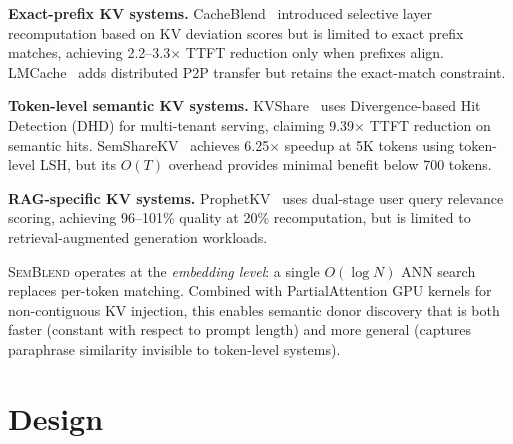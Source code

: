 \documentclass[11pt,twocolumn]{article}
\newcommand{\semblend}{\textsc{SemBlend}\xspace}
\begin{document}
\textbf{Exact-prefix KV systems.}
CacheBlend~\cite{cacheblend} introduced selective layer recomputation
based on KV deviation scores but is limited to exact prefix matches,
achieving 2.2--3.3$\times$ TTFT reduction only when prefixes align.
LMCache~\cite{lmcache} adds distributed P2P transfer but retains the
exact-match constraint.

\textbf{Token-level semantic KV systems.}
KVShare~\cite{kvshare} uses Divergence-based Hit Detection (DHD)
for multi-tenant serving, claiming 9.39$\times$ TTFT reduction on
semantic hits. SemShareKV~\cite{semsharekv} achieves 6.25$\times$
speedup at 5K tokens using token-level LSH, but its $O(T)$ overhead
provides minimal benefit below 700 tokens.

\textbf{RAG-specific KV systems.}
ProphetKV~\cite{prophetkv} uses dual-stage user query relevance scoring,
achieving 96--101\% quality at 20\% recomputation, but is limited to
retrieval-augmented generation workloads.

\semblend operates at the \emph{embedding level}: a single $O(\log N)$
ANN search replaces per-token matching. Combined with PartialAttention
GPU kernels for non-contiguous KV injection, this enables semantic
donor discovery that is both faster (constant with respect to prompt
length) and more general (captures paraphrase similarity invisible to
token-level systems).


\section{Design}
\label{sec:design}
\end{document}
